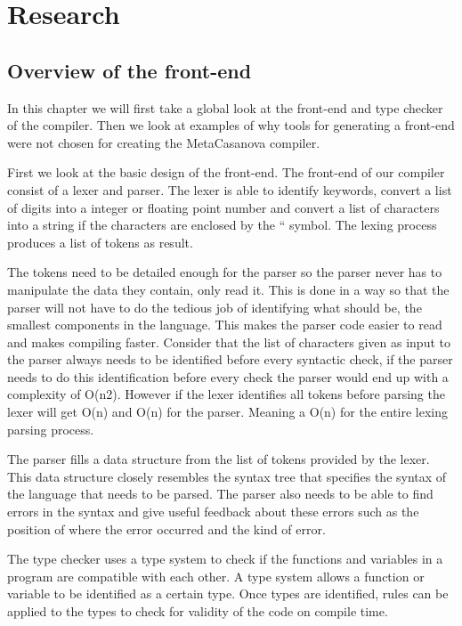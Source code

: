 \section{Research}

\subsection{Overview of the front-end}

In this chapter we will first take a global look at the front-end and type checker of the compiler. Then we look at examples of why tools for generating a front-end were not chosen for creating the MetaCasanova compiler. 

First we look at the basic design of the front-end. The front-end of our compiler consist of a lexer and parser. The lexer is able to identify keywords, convert a list of digits into a integer or floating point number and convert a list of characters into a string if the characters are enclosed by the “ symbol. The lexing process produces a list of tokens as result. 

The tokens need to be detailed enough for the parser so the parser never has to manipulate the data they contain, only read it. This is done in a way so that the parser will not have to do the tedious job of identifying what should be, the smallest components in the language. This makes the parser code easier to read and makes compiling faster. Consider that the list of characters given as input to the parser always needs to be identified before every syntactic check, if the parser needs to do this identification before every check the parser would end up with a complexity of O(n2). However if the lexer identifies all tokens before parsing the lexer will get O(n) and O(n) for the parser. Meaning a O(n) for the entire lexing parsing process. 

The parser fills a data structure from the list of tokens provided by the lexer. This data structure closely resembles the syntax tree that specifies the syntax of the language that needs to be parsed. The parser also needs to be able to find errors in the syntax and give useful feedback about these errors such as the position of where the error occurred and the kind of error. 

The type checker uses a type system to check if the functions and variables in a program are compatible with each other. A type system allows a function or variable to be identified as a certain type. Once types are identified, rules can be applied to the types to check for validity of the code on compile time. 

